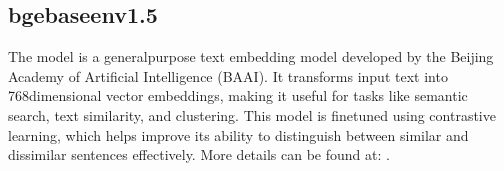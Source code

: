 \documentclass[letterpaper,11pt,english]{sphinxmanual}
\begin{document}
\begin{sphinxVerbatim}[commandchars=\\\{\}]
\PYG{p}{[}\PYG{p}{[}          \PYG{p}{]}
      \PYG{p}{[}          \PYG{p}{]}
      \PYG{p}{[}         \PYG{p}{]}\PYG{p}{]}
\PYG{p}{[}\PYG{p}{[} \PYG{p}{]}\PYG{p}{]}
\end{sphinxVerbatim}


\subsection{bge\sphinxhyphen{}base\sphinxhyphen{}en\sphinxhyphen{}v1.5}
\label{\detokenize{embedding:bge-base-en-v1-5}}
\sphinxAtStartPar
The  model is a general\sphinxhyphen{}purpose text embedding model developed
by the Beijing Academy of Artificial Intelligence (BAAI). It transforms input text
into 768\sphinxhyphen{}dimensional vector embeddings, making it useful for tasks like semantic
search, text similarity, and clustering. This model is fine\sphinxhyphen{}tuned using contrastive
learning, which helps improve its ability to distinguish between similar and
dissimilar sentences effectively. More details can be found
at:  .
\end{document}
